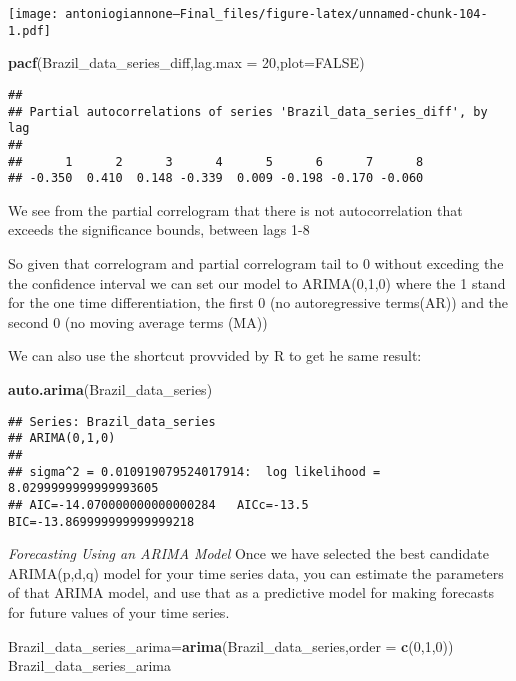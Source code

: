 \documentclass[
]{article}
\newenvironment{Shaded}{\begin{snugshade}}{\end{snugshade}}
\newcommand{\AttributeTok}[1]{\textcolor[rgb]{0.13,0.29,0.53}{#1}}
\newcommand{\ConstantTok}[1]{\textcolor[rgb]{0.56,0.35,0.01}{#1}}
\newcommand{\DecValTok}[1]{\textcolor[rgb]{0.00,0.00,0.81}{#1}}
\newcommand{\FunctionTok}[1]{\textcolor[rgb]{0.13,0.29,0.53}{\textbf{#1}}}
\newcommand{\NormalTok}[1]{#1}
\newcommand{\OtherTok}[1]{\textcolor[rgb]{0.56,0.35,0.01}{#1}}
\begin{document}
\texttt{[image: antoniogiannone---Final\_files/figure-latex/unnamed-chunk-104-1.pdf]}

\begin{Shaded}
\begin{Highlighting}[]
\FunctionTok{pacf}\NormalTok{(Brazil\_data\_series\_diff,}\AttributeTok{lag.max =} \DecValTok{20}\NormalTok{,}\AttributeTok{plot=}\ConstantTok{FALSE}\NormalTok{)}
\end{Highlighting}
\end{Shaded}

\begin{verbatim}
## 
## Partial autocorrelations of series 'Brazil_data_series_diff', by lag
## 
##      1      2      3      4      5      6      7      8 
## -0.350  0.410  0.148 -0.339  0.009 -0.198 -0.170 -0.060
\end{verbatim}

We see from the partial correlogram that there is not autocorrelation
that exceeds the significance bounds, between lags 1-8

So given that correlogram and partial correlogram tail to 0 without
exceding the the confidence interval we can set our model to
ARIMA(0,1,0) where the 1 stand for the one time differentiation, the
first 0 (no autoregressive terms(AR)) and the second 0 (no moving
average terms (MA))

We can also use the shortcut provvided by R to get he same result:

\begin{Shaded}
\begin{Highlighting}[]
\FunctionTok{auto.arima}\NormalTok{(Brazil\_data\_series)}
\end{Highlighting}
\end{Shaded}

\begin{verbatim}
## Series: Brazil_data_series 
## ARIMA(0,1,0) 
## 
## sigma^2 = 0.010919079524017914:  log likelihood = 8.0299999999999993605
## AIC=-14.070000000000000284   AICc=-13.5   BIC=-13.869999999999999218
\end{verbatim}

\emph{Forecasting Using an ARIMA Model} Once we have selected the best
candidate ARIMA(p,d,q) model for your time series data, you can estimate
the parameters of that ARIMA model, and use that as a predictive model
for making forecasts for future values of your time series.

\begin{Shaded}
\begin{Highlighting}[]
\NormalTok{Brazil\_data\_series\_arima}\OtherTok{=}\FunctionTok{arima}\NormalTok{(Brazil\_data\_series,}\AttributeTok{order =} \FunctionTok{c}\NormalTok{(}\DecValTok{0}\NormalTok{,}\DecValTok{1}\NormalTok{,}\DecValTok{0}\NormalTok{))}
\NormalTok{Brazil\_data\_series\_arima}
\end{Highlighting}
\end{Shaded}
\end{document}

